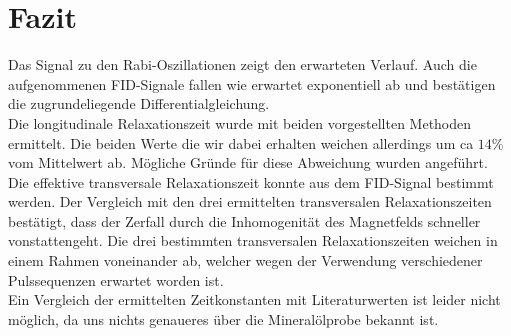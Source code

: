 \section{Fazit}
Das Signal zu den Rabi-Oszillationen zeigt den erwarteten Verlauf. Auch die aufgenommenen FID-Signale fallen wie erwartet exponentiell ab und bestätigen die zugrundeliegende Differentialgleichung.\\
Die longitudinale Relaxationszeit wurde mit beiden vorgestellten Methoden ermittelt. Die beiden Werte die wir dabei erhalten weichen allerdings um ca $14\%$ vom Mittelwert ab. Mögliche Gründe für diese Abweichung wurden angeführt.\\
Die effektive transversale Relaxationszeit konnte aus dem FID-Signal bestimmt werden. Der Vergleich mit den drei ermittelten transversalen Relaxationszeiten bestätigt, dass der Zerfall durch die Inhomogenität des Magnetfelds schneller vonstattengeht. Die drei bestimmten transversalen Relaxationszeiten weichen in einem Rahmen voneinander ab, welcher wegen der Verwendung verschiedener Pulssequenzen erwartet worden ist. \\ 
Ein Vergleich der ermittelten Zeitkonstanten mit Literaturwerten ist leider nicht möglich, da uns nichts genaueres über die Mineralölprobe bekannt ist.          
